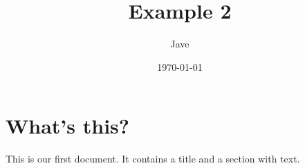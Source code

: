 \documentclass[letterpaper, 12pt]{article}
\begin{document}
\title{Example 2}
\author{Jave}
\date{\today}
\maketitle
\section{What's this?}
This is our first document. It contains a title and a section with text.
\end{document}
